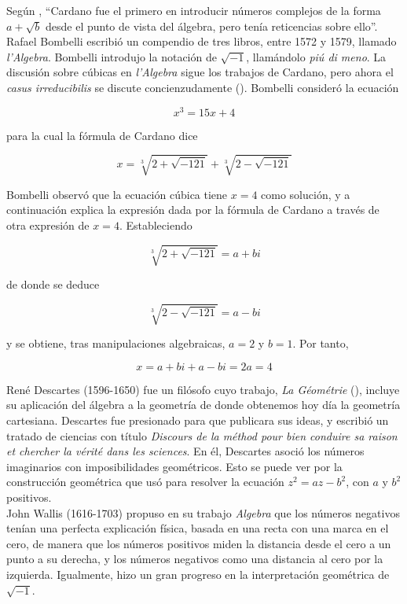 \documentclass[../main.tex]{memoir}
\begin{document}
Según \cite{waerden1985}, ``Cardano fue el primero en introducir números complejos de la forma $a + \sqrt{b}$ desde el punto de vista del álgebra, pero tenía reticencias sobre ello''.\\

Rafael Bombelli escribió un compendio de tres libros, entre 1572 y 1579, llamado \textit{l'Algebra}. Bombelli introdujo la notación de $\sqrt{-1}$, llamándolo \textit{piú di meno}. La discusión sobre cúbicas en \textit{l'Algebra} sigue los trabajos de Cardano, pero ahora el \textit{casus irreducibilis} se discute concienzudamente (\cite{blank1999}). Bombelli consideró la ecuación

$$ x^3 = 15x+4$$

para la cual la fórmula de Cardano dice

$$ x = \sqrt[3]{2+\sqrt{-121}} + \sqrt[3]{2-\sqrt{-121}}$$

Bombelli observó que la ecuación cúbica tiene $x = 4$ como solución, y a continuación explica la expresión dada por la fórmula de Cardano a través de otra expresión de $x = 4$. Estableciendo

$$ \sqrt[3]{2+\sqrt{-121}} = a +bi$$

de donde se deduce

$$ \sqrt[3]{2-\sqrt{-121}} = a-bi$$

y se obtiene, tras manipulaciones algebraicas, $a=2$ y $b=1$. Por tanto,

$$x = a+bi +a -bi = 2a = 4$$

René Descartes (1596-1650) fue un filósofo cuyo trabajo, \textit{La Géométrie} (\cite{descartes1952}), incluye su aplicación del álgebra a la geometría de donde obtenemos hoy día la geometría cartesiana. Descartes fue presionado para que publicara sus ideas, y escribió un tratado de ciencias con título \textit{Discours de la méthod pour bien conduire sa raison et chercher la vérité dans les sciences}. En él, Descartes asoció los números imaginarios con imposibilidades geométricos. Esto se puede ver por la construcción geométrica que usó para resolver la ecuación $z^2 =az-b^2$, con $a$ y $b^2$ positivos. \\

John Wallis (1616-1703) propuso en su trabajo \textit{Algebra} que los números negativos tenían una perfecta explicación física, basada en una recta con una marca en el cero, de manera que los números positivos miden la distancia desde el cero a un punto a su derecha, y los números negativos como una distancia al cero por la izquierda. Igualmente, hizo un gran progreso en la interpretación geométrica de $\sqrt{-1}$.  \\
\end{document}
